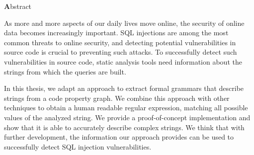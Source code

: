 \vspace*{2cm}

\begin{center}
{ \textbf Abstract}
\end{center}
\noindent


As more and more aspects of our daily lives move online, the security of online data becomes increasingly important. SQL injections are among the most common threats to online security, and detecting potential vulnerabilities in source code is crucial to preventing such attacks. To successfully detect such vulnerabilities in source code, static analysis tools need information about the strings from which the queries are built.

In this thesis, we adapt an approach to extract formal grammars that describe strings from a code property graph. We combine this approach with other techniques to obtain a human readable regular expression, matching all possible values of the analyzed string.
We provide a proof-of-concept implementation and show that it is able to accurately describe complex strings. We think that with further development, the information our approach provides can be used to successfully detect SQL injection vulnerabilities.
